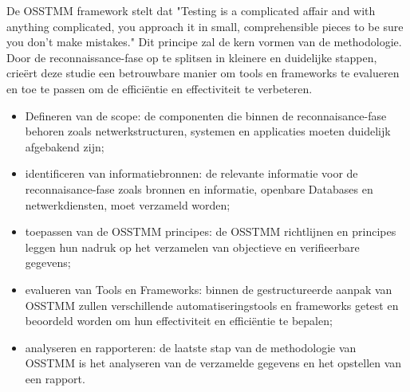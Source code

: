 De OSSTMM framework stelt dat "Testing is a complicated affair and with anything complicated, you approach it in small, comprehensible pieces to be sure you don’t make mistakes." \~\autocite{Herzog}
Dit principe zal de kern vormen van de methodologie. 
Door de reconnaissance-fase op te splitsen in kleinere en duidelijke stappen, crieërt deze studie een betrouwbare manier om tools en frameworks te evalueren en toe te passen om de efficiëntie en effectiviteit te verbeteren.

\begin{itemize}
    \item Defineren van de scope: 
    de componenten die binnen de reconnaisance-fase behoren zoals netwerkstructuren, systemen en applicaties moeten duidelijk afgebakend zijn;
    \item identificeren van informatiebronnen:
    de relevante informatie voor de reconnaisance-fase zoals bronnen en informatie, openbare Databases en netwerkdiensten, moet verzameld worden; 
    \item toepassen van de OSSTMM principes:
    de OSSTMM richtlijnen en principes leggen hun nadruk op het verzamelen van objectieve en verifieerbare gegevens;
    \item evalueren van Tools en Frameworks:
    binnen de gestructureerde aanpak van OSSTMM zullen verschillende automatiseringstools en frameworks getest en beoordeld worden om hun effectiviteit en efficiëntie te bepalen;
    \item analyseren en rapporteren:
    de laatste stap van de methodologie van OSSTMM is het analyseren van de verzamelde gegevens en het opstellen van een rapport.
\end{itemize}



